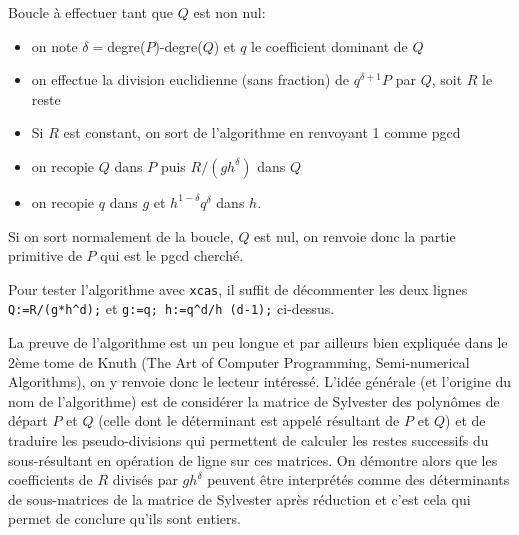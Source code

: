 \documentclass[a4paper,11pt]{article}
\begin{document}
Boucle à effectuer tant que $Q$ est non nul:
\begin{itemize}
  \item on note $\delta =$degre($P$)-degre($Q$) et $q$ le coefficient dominant
  de $Q$
  
  \item on effectue la division euclidienne (sans fraction) de $q^{\delta + 1}
  P$ par $Q$, soit $R$ le reste
  
  \item Si $R$ est constant, on sort de l'algorithme en renvoyant 1 comme pgcd
  
  \item on recopie $Q$ dans $P$ puis $R / ( g h^{\delta} )$ dans $Q$
  
  \item on recopie $q$ dans $g$ et $h^{1 - \delta} q^{\delta}$ dans $h$.
\end{itemize}
Si on sort normalement de la boucle, $Q$ est nul, on renvoie donc la partie
primitive de $P$ qui est le pgcd cherché.

Pour tester l'algorithme avec {\tt{xcas}}, il suffit de décommenter les
deux lignes {\tt{Q:=R/(g*h\^{ }d);}} et {\tt{g:=q; h:=q\^{ }d/h\^{
}(d-1);}} ci-dessus.

La preuve de l'algorithme est un peu longue et par ailleurs bien expliqu\'ee
dans le 2ème tome de Knuth (The Art of Computer Programming, Semi-numerical
Algorithms), on y renvoie donc le lecteur intéressé. L'idée générale
(et l'origine du nom de l'algorithme) 
est de considérer la matrice de Sylvester des polynômes de
départ $P$ et $Q$ (celle dont le déterminant est appelé résultant de $P$ et
$Q$) et de traduire les pseudo-divisions qui permettent de calculer les restes
successifs du sous-résultant en opération de ligne sur ces matrices. On
démontre alors que les coefficients de $R$ divisés par $g h^{\delta}$ peuvent
être interprétés comme des déterminants de sous-matrices de la matrice de
Sylvester après réduction et c'est cela qui permet de conclure qu'ils sont
entiers.
\end{document}
